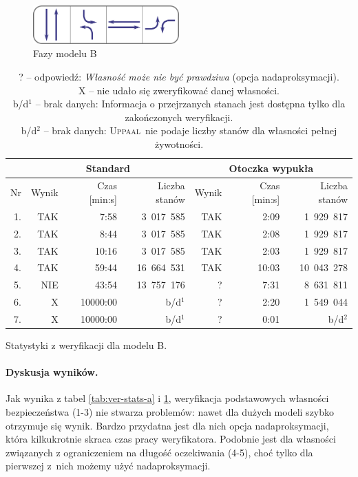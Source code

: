 \documentclass{pracamgr}
\newcommand{\upp}{\textsc{Uppaal}}
\theoremstyle{plain}
\begin{document}
\begin{figure}
  \centering
  \includegraphics[width=0.5\textwidth]{img/ver-b-cycle}
  \caption{Fazy modelu B}
  \label{img:ver-phases-b}
\end{figure}
\begin{table}[ht]
  \centering
  \begin{tabular}{|r||r|r|r||r|r|r||}
    \hline
    & \multicolumn{3}{c||}{\bf Standard} & \multicolumn{3}{c||}{\bf
      Otoczka wypukła} \\ \hline
    Nr   & Wynik & Czas [min:s] & Liczba stanów & Wynik & Czas [min:s] &
    Liczba stanów\\ \hline
    1. & TAK &  7:58 & 3~017~585  & TAK  & 2:09  &  1~929~817 \\
    2. & TAK &  8:44 & 3~017~585  & TAK  & 2:08  &  1~929~817 \\
    3. & TAK & 10:16 & 3~017~585  & TAK  & 2:03  &  1~929~817 \\
    4. & TAK & 59:44 & 16~664~531 & TAK  & 10:03 & 10~043~278 \\
    5. & NIE & 43:54 & 13~757~176 & ?    & 7:31  &  8~631~811 \\
    6. & X  & 10000:00 & b/d$^1$           & ?    & 2:20  &  1~549~044 \\
    7. & X  & 10000:00 & b/d$^1$         & ?    & 0:01  &       b/d$^2$ 
    \\\hline
  \end{tabular}
  \caption{Statystyki z weryfikacji dla modelu B.}
  \caption*{\footnotesize ? -- odpowiedź: \emph{Własność może nie być
      prawdziwa} (opcja nadaproksymacji).\\
            X -- nie udało się zweryfikować danej własności.\\
    b/d$^1$ -- brak danych: Informacja o przejrzanych stanach jest
    dostępna tylko dla zakończonych weryfikacji.\\
    b/d$^2$ -- brak danych: \upp\ nie podaje liczby stanów dla
    własności pełnej żywotności.
  }
  \label{tab:ver-stats-b}
\end{table}

\paragraph{Dyskusja wyników.}
Jak wynika z tabel \ref{tab:ver-stats-a} i \ref{tab:ver-stats-b},
weryfikacja podstawowych własności bezpieczeństwa (1-3) nie stwarza
problemów: nawet dla dużych modeli szybko otrzymuje się
wynik. Bardzo przydatna jest dla nich opcja nadaproksymacji, która
kilkukrotnie skraca czas pracy weryfikatora. Podobnie jest dla
własności związanych z ograniczeniem na długość oczekiwania (4-5),
choć tylko dla pierwszej z~nich możemy użyć nadaproksymacji.
\end{document}
